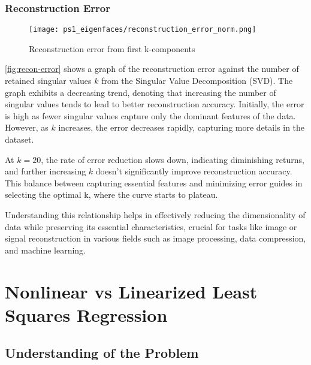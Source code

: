\documentclass{article} %
\theoremstyle{definition}
\theoremstyle{remark}
\theoremstyle{plain}
\begin{document}
    \subsubsection{Reconstruction Error}
        \begin{figure}[h!]
            \centering
            \texttt{[image: ps1\_eigenfaces/reconstruction\_error\_norm.png]}
            \caption{Reconstruction error from first k-components}
            \label{fig:recon-error}
        \end{figure}
        
        \autoref{fig:recon-error} shows a graph of the reconstruction error against the number of retained singular values \(k\) from the Singular Value Decomposition (SVD).
        The graph exhibits a decreasing trend, denoting that increasing the number of singular values tends to lead to better reconstruction accuracy. Initially, the error is high as fewer singular values capture only the dominant features of the data. However, as \(k\) increases, the error decreases rapidly, capturing more details in the dataset.
        
        At \(k = 20\), the rate of error reduction slows down, indicating diminishing returns, and further increasing \(k\) doesn't significantly improve reconstruction accuracy. This balance between capturing essential features and minimizing error guides in selecting the optimal k, where the curve starts to plateau.

        Understanding this relationship helps in effectively reducing the dimensionality of data while preserving its essential characteristics, crucial for tasks like image or signal reconstruction in various fields such as image processing, data compression, and machine learning.





\pagebreak
    
\section{Nonlinear vs Linearized Least Squares Regression}

\subsection{Understanding of the Problem}
\end{document}
